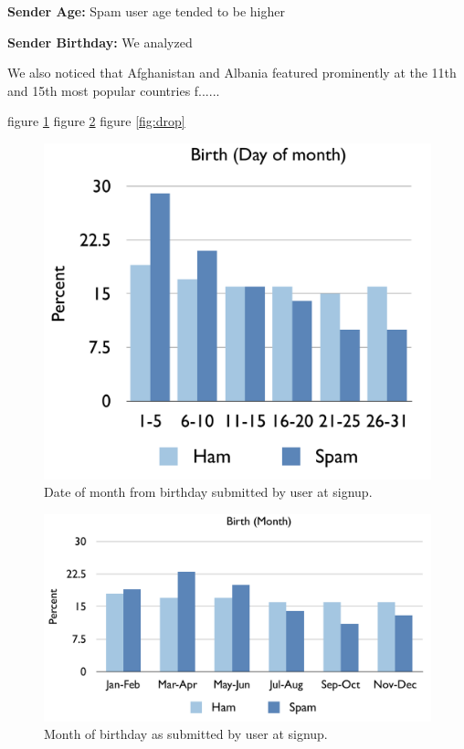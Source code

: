 \documentclass[preprint]{acm_proc_article-sp}
\begin{document}
\textbf{Sender Age:} Spam user age tended to be higher 

\textbf{Sender Birthday:} We analyzed 

We also noticed that Afghanistan and Albania featured prominently at the 11th and 15th most popular countries f......

figure \ref{fig:day}
figure \ref{fig:month}
figure \ref{fig:drop}
\begin{figure}[h]
    \centering
    \includegraphics[width=\linewidth]{figures/dob-day.pdf}
    \caption{Date of month from birthday submitted by user at signup.}
    \label{fig:day}
\end{figure}

\begin{figure}[h]
    \centering
    \includegraphics[width=\linewidth]{figures/dob-month.pdf}
    \caption{Month of birthday as submitted by user at signup.}
    \label{fig:month}
\end{figure}
\end{document}
